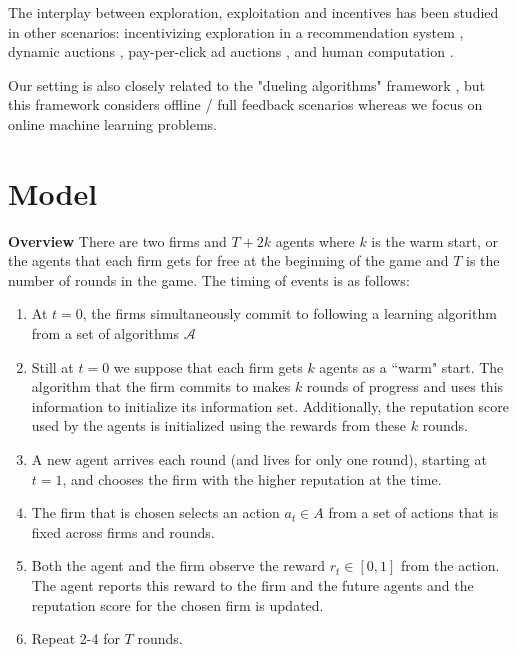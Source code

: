 \documentclass[letterpaper]{article}
\theoremstyle{definition}
\newcommand{\OMIT}[1]{}
\begin{document}
The interplay between exploration, exploitation and incentives has been studied in other scenarios: incentivizing exploration in a recommendation system
    \cite{Frazier-ec14,Kremer-JPE14,ICexploration-ec15,Bimpikis-exploration-ms17},
dynamic auctions
    \cite{AtheySegal-econometrica13,DynPivot-econometrica10,Kakade-pivot-or13},
pay-per-click ad auctions 
    \cite{MechMAB-ec09,DevanurK09,Transform-ec10-jacm},
and human computation
    \cite{RepeatedPA-ec14,Ghosh-itcs13,Krause-www13}.

\OMIT{ %
The interplay between exploration, exploitation, and incentives has been studied in several other settings, the most relevant to this paper being \citealt*{che2017recommender}, \citealt*{kremer2014implementing}, \citealt*{mansour2015bayesian}. The strategic experimentation literature in economics, such as \citealt*{bolton1999strategic} and \citealt*{keller2005strategic}, studies models with self-interested agents jointly performing exploration whereas in this paper the firms cannot observe the actions or the payoffs of the other firms and exploration is coordinated by the consumers.
} %

Our setting is also closely related to the "dueling algorithms" framework \cite{DuelingAlgs-stoc11}, but this framework considers offline / full feedback scenarios whereas we focus on online machine learning problems.


\section{Model}\label{sec:model}

\textbf{Overview} There are two firms and $T+2k$ agents where $k$ is the warm start, or the agents that each firm gets for free at the beginning of the game and $T$ is the number of rounds in the game. The timing of events is as follows:
\begin{enumerate}
\item At $t = 0$, the firms simultaneously commit to following a learning algorithm from a set of algorithms $\mathcal{A}$
\item Still at $t = 0$ we suppose that each firm gets $k$ agents as a ``warm" start. The algorithm that the firm commits to makes $k$ rounds of progress and uses this information to initialize its information set. Additionally, the reputation score used by the agents is initialized using the rewards from these $k$ rounds.
\item A new agent arrives each round (and lives for only one round), starting at $t = 1$, and chooses the firm with the higher reputation at the time.
\item The firm that is chosen selects an action $a_{t} \in A$ from a set of actions that is fixed across firms and rounds.
\item Both the agent and the firm observe the reward $r_t \in [0, 1]$ from the action. The agent reports this reward to the firm and the future agents and the reputation score for the chosen firm is updated.
\item Repeat 2-4 for $T$ rounds.
\end{enumerate}
\end{document}
